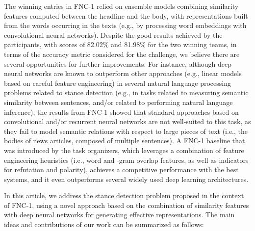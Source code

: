 The winning entries in FNC-1 relied on ensemble models combining similarity features computed between the headline and the body, with representations built from the words occurring in the texts (e.g., by processing word embeddings with convolutional neural networks). Despite the good results achieved by the participants, with scores of 82.02\% and 81.98\% for the two winning teams, in terms of the accuracy metric considered for the challenge, we believe there are several opportunities for further improvements. For instance, although deep neural networks are known to outperform other approaches (e.g., linear models based on careful feature engineering) in several natural language processing problems related to stance detection (e.g., in tasks related to measuring semantic similarity between sentences, and/or related to performing natural language inference), the results from FNC-1 showed that standard approaches based on convolutional and/or recurrent neural networks are not well-suited to this task, as they fail to model semantic relations with respect to large pieces of text (i.e., the bodies of news articles, composed of multiple sentences). A FNC-1 baseline that was introduced by the task organizers, which leverages a combination of feature engineering heuristics (i.e., word and -gram overlap features, as well as indicators for refutation and polarity), achieves a competitive performance with the best systems, and it even outperforms several widely used deep learning architectures. 

In this article, we address the stance detection problem proposed in the context of FNC-1, using a novel approach based on the combination of similarity features with deep neural networks for generating effective representations. The main ideas and contributions of our work can be summarized as follows:

